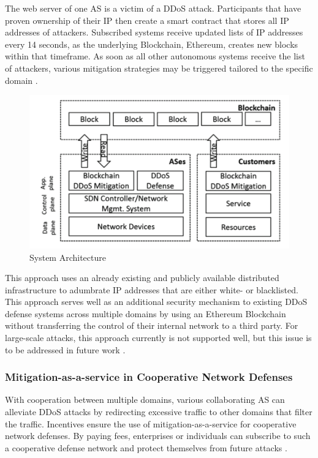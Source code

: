 The web server of one AS is a victim of a DDoS attack. Participants that have proven ownership of their IP then create a smart contract that stores all IP addresses of attackers. Subscribed systems receive updated lists of IP addresses every 14 seconds, as the underlying Blockchain, Ethereum, creates new blocks within that timeframe. As soon as all other autonomous systems receive the list of attackers, various mitigation strategies may be triggered tailored to the specific domain \cite{Rodrigues2017}.
\begin{figure}[ht]
  \begin{center}
    \includegraphics[scale=0.6]{Talk7/img/ddos/collaborative_ddos_mitigation_system_architecture}
  \end{center}
  \caption{System Architecture}
  \label{system_architecture}
\end{figure}

This approach uses an already existing and publicly available distributed infrastructure to adumbrate IP addresses that are either white- or blacklisted. This approach serves well as an additional security mechanism to existing DDoS defense systems across multiple domains by using an Ethereum Blockchain without transferring the control of their internal network to a third party. For large-scale attacks, this approach currently is not supported well, but this issue is to be addressed in future work \cite{Rodrigues2017}.


\subsubsection{Mitigation-as-a-service in Cooperative Network Defenses}

With cooperation between multiple domains, various collaborating AS can alleviate DDoS attacks by redirecting excessive traffic to other domains that filter the traffic. Incentives ensure the use of mitigation-as-a-service for cooperative network defenses. By paying fees, enterprises or individuals can subscribe to such a cooperative defense network and protect themselves from future attacks \cite{Mannhart2018}.

